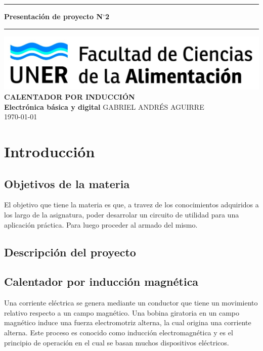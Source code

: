\documentclass[12pt]{article}
\begin{document}
\begin{titlepage}
\begin{center}
\vspace*{2\baselineskip}
\hrule height 3pt
\vspace*{0.5\baselineskip}
{\Huge \textbf{Presentación de proyecto N$^\circ$2}}
\vspace*{0.5\baselineskip}
\hrule
\vspace*{10\baselineskip}
\includegraphics[scale=0.35]{src/institucion/Logo_fcal-1174x247.png}
\vspace*{2\baselineskip}
\textbf{\\CALENTADOR POR INDUCCIÓN\\}
\textbf{Electrónica básica y digital}
\vfill
GABRIEL ANDRÉS AGUIRRE \\
\today
\end{center}
\end{titlepage}

\tableofcontents
\thispagestyle{empty}
\newpage

\setcounter{page}{1}

\section{Introducción}

\subsection{Objetivos de la materia}
El objetivo que tiene la materia es que, a travez de los conocimientos adquiridos a los largo de la asignatura, poder desarrolar un circuito de utilidad para una aplicación práctica. Para luego proceder al armado del mismo.

\subsection{Descripción del proyecto}

\subsection{Calentador por inducción magnética}
Una corriente eléctrica se genera mediante un conductor que tiene un movimiento relativo respecto a un campo magnético. Una bobina giratoria en un campo magnético induce una fuerza electromotriz alterna, la cual origina una corriente alterna. Este proceso es conocido como inducción electromagnética y es el principio de operación en el cual se basan muchos dispositivos eléctricos.
\end{document}
